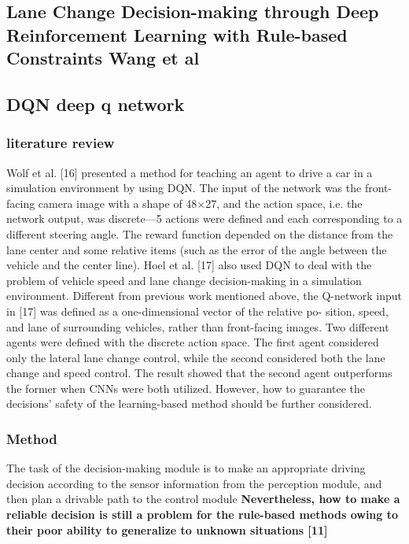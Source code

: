 \documentclass{article}
\begin{document}
  \subsection{Lane Change Decision-making through Deep
Reinforcement Learning with Rule-based
Constraints Wang et al}
  	
  	\subsection{DQN deep q network}
  	
    \subsubsection{literature review}
    Wolf et al. [16] presented a method
for teaching an agent to drive a car in a simulation environment
by using DQN. The input of the network was the front-facing
camera image with a shape of 48×27, and the action space, i.e.
the network output, was discrete—5 actions were defined and
each corresponding to a different steering angle. The reward
function depended on the distance from the lane center and
some relative items (such as the error of the angle between the
vehicle and the center line). Hoel et al. [17] also used DQN
to deal with the problem of vehicle speed and lane change
decision-making in a simulation environment. Different from
previous work mentioned above, the Q-network input in [17]
was defined as a one-dimensional vector of the relative po-
sition, speed, and lane of surrounding vehicles, rather than
front-facing images. Two different agents were defined with
the discrete action space. The first agent considered only the
lateral lane change control, while the second considered both
the lane change and speed control. The result showed that the
second agent outperforms the former when CNNs were both
utilized. However, how to guarantee the decisions’ safety of
the learning-based method should be further considered.

\subsubsection{Method}
The
task of the decision-making module is to make an appropriate
driving decision according to the sensor information from the
perception module, and then plan a drivable path to the control
module
\textbf{Nevertheless, how to make a reliable decision is still a problem
for the rule-based methods owing to their poor ability to
generalize to unknown situations [11]}
\end{document}
